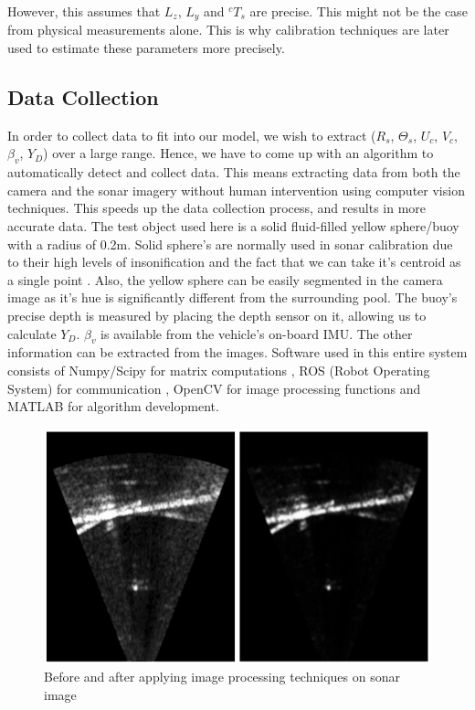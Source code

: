 \documentclass[15pt]{article}
\let\Theta\varTheta
\newcommand{\RSonar}{$\si{\textit{R}_{s}}$\xspace}
\newcommand{\ThetaSonar}{$\si{\Theta_{s}}$\xspace}
\newcommand{\UCamera}{$\si{\textit{U}_{c}}$\xspace}
\newcommand{\VCamera}{$\si{\textit{V}_{c}}$\xspace}
\newcommand{\YDepth}{$Y_{D}$\xspace}
\newcommand{\PitchVehicle}{${\beta_{v}}$\xspace}
\begin{document}
However, this assumes that $L_{z}$, $L_{y}$ and $^{c}T_{s}$ are precise. This might not be the case from physical measurements alone. This is why calibration techniques are later used to estimate these parameters more precisely.

\subsection{Data Collection}

In order to collect data to fit into our model, we wish to extract (\RSonar, \ThetaSonar, \UCamera, \VCamera, \PitchVehicle, \YDepth) over a large range. Hence, we have to come up with an algorithm to automatically detect and collect data. This means extracting data from both the camera and the sonar imagery without human intervention using computer vision techniques. This speeds up the data collection process, and results in more accurate data. The test object used here is a solid fluid-filled yellow sphere/buoy with a radius of 0.2m. Solid sphere's are normally used in sonar calibration due to their high levels of insonification and the fact that we can take it's centroid as a single point \cite{4804062}. Also, the yellow sphere can be easily segmented in the camera image as it's hue is significantly different from the surrounding pool. The buoy's precise depth is measured by placing the depth sensor on it, allowing us to calculate \YDepth. \PitchVehicle is available from the vehicle's on-board IMU. The other information can be extracted from the images. Software used in this entire system consists of Numpy/Scipy for matrix computations \cite{dubois-1999-cse}, ROS (Robot Operating System) for communication \cite{Quigley2009}, OpenCV for image processing functions \cite{opencv_library} and MATLAB for algorithm development.

\begin{figure}[h!]
  \centering
  \includegraphics[scale=0.4]{sonarprocessed}
  \captionsetup{justification=centering}
  \caption{Before and after applying image processing techniques on sonar image}
\end{figure}
\end{document}
